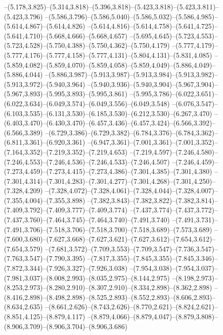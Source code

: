   --(5.178,3.825)--(5.314,3.818)--(5.396,3.818)--(5.423,3.818)--(5.423,3.811)--(5.423,3.796)%
  --(5.586,3.796)--(5.586,5.040)--(5.586,5.032)--(5.586,4.985)--(5.614,4.867)--(5.614,4.826)%
  --(5.614,4.816)--(5.614,4.758)--(5.641,4.725)--(5.641,4.710)--(5.668,4.666)--(5.668,4.657)%
  --(5.695,4.645)--(5.723,4.553)--(5.723,4.528)--(5.750,4.388)--(5.750,4.362)--(5.750,4.179)%
  --(5.777,4.179)--(5.777,4.176)--(5.777,4.158)--(5.777,4.131)--(5.804,4.131)--(5.831,4.085)%
  --(5.859,4.082)--(5.859,4.070)--(5.859,4.058)--(5.859,4.049)--(5.886,4.049)--(5.886,4.044)%
  --(5.886,3.987)--(5.913,3.987)--(5.913,3.984)--(5.913,3.982)--(5.913,3.972)--(5.940,3.964)%
  --(5.940,3.936)--(5.940,3.904)--(5.967,3.904)--(5.967,3.893)--(5.995,3.893)--(5.995,3.861)%
  --(5.995,3.786)--(6.022,3.651)--(6.022,3.634)--(6.049,3.574)--(6.049,3.556)--(6.049,3.548)%
  --(6.076,3.547)--(6.103,3.535)--(6.131,3.530)--(6.185,3.530)--(6.212,3.530)--(6.267,3.470)%
  --(6.403,3.470)--(6.430,3.470)--(6.457,3.436)--(6.457,3.424)--(6.566,3.392)--(6.566,3.389)%
  --(6.729,3.386)--(6.729,3.382)--(6.784,3.376)--(6.784,3.362)--(6.811,3.361)--(6.920,3.361)%
  --(6.947,3.361)--(7.001,3.361)--(7.001,3.352)--(7.164,3.352)--(7.219,3.352)--(7.219,4.653)%
  --(7.219,4.597)--(7.246,4.580)--(7.246,4.553)--(7.246,4.536)--(7.246,4.533)--(7.246,4.507)%
  --(7.246,4.459)--(7.273,4.459)--(7.273,4.415)--(7.273,4.386)--(7.301,4.385)--(7.301,4.380)%
  --(7.301,4.314)--(7.301,4.283)--(7.301,4.277)--(7.301,4.268)--(7.301,4.250)--(7.328,4.209)%
  --(7.328,4.072)--(7.328,4.061)--(7.328,4.044)--(7.328,4.007)--(7.355,4.004)--(7.355,3.898)%
  --(7.382,3.843)--(7.382,3.822)--(7.382,3.814)--(7.409,3.792)--(7.409,3.777)--(7.409,3.774)%
  --(7.437,3.774)--(7.437,3.772)--(7.437,3.760)--(7.464,3.745)--(7.464,3.740)--(7.491,3.740)%
  --(7.491,3.731)--(7.491,3.706)--(7.518,3.706)--(7.518,3.700)--(7.518,3.689)--(7.573,3.689)%
  --(7.600,3.680)--(7.627,3.668)--(7.627,3.621)--(7.627,3.612)--(7.654,3.612)--(7.654,3.579)%
  --(7.681,3.572)--(7.709,3.553)--(7.709,3.547)--(7.736,3.547)--(7.763,3.547)--(7.790,3.395)%
  --(7.817,3.355)--(7.845,3.355)--(7.845,3.346)--(7.872,3.344)--(7.926,3.327)--(7.926,3.038)%
  --(7.954,3.038)--(7.954,3.037)--(7.981,3.037)--(8.008,2.993)--(8.035,2.975)--(8.144,2.975)%
  --(8.198,2.973)--(8.253,2.973)--(8.280,2.910)--(8.307,2.910)--(8.334,2.898)--(8.362,2.898)%
  --(8.416,2.898)--(8.498,2.898)--(8.525,2.893)--(8.552,2.893)--(8.606,2.893)--(8.634,2.635)%
  --(8.661,2.626)--(8.743,2.626)--(8.770,2.621)--(8.824,2.621)--(8.851,4.125)--(8.879,4.117)%
  --(8.879,4.066)--(8.879,4.047)--(8.879,3.808)--(8.906,3.709)--(8.906,3.704)--(8.906,3.686)%
